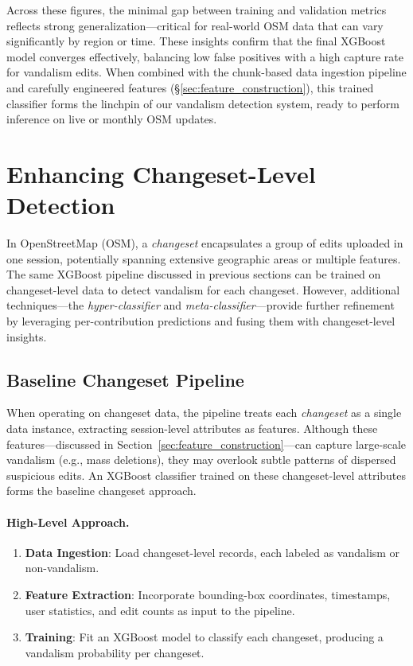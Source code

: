 \documentclass[
    13pt, %
    a4paper, %
    listof=totoc, %
    bibliography=totoc, %
    index=totoc, %
    headsepline
]{scrreprt}
\begin{document}
Across these figures, the minimal gap between training and validation metrics reflects strong
generalization—critical for real-world OSM data that can vary significantly by region or time.
These insights confirm that the final XGBoost model converges effectively, balancing low false
positives with a high capture rate for vandalism edits. When combined with the chunk-based data ingestion pipeline and carefully engineered features (\S\ref{sec:feature_construction}), this trained classifier forms
the linchpin of our vandalism detection system, ready to perform inference on live or monthly
OSM updates.


\newpage
\section{Enhancing Changeset-Level Detection}
\label{sec:changeset_level_detection}

In OpenStreetMap (OSM), a \emph{changeset} encapsulates a group of edits uploaded in one session, potentially spanning extensive geographic areas or multiple features. The same XGBoost pipeline discussed in previous sections can be trained on changeset-level data to detect vandalism for each changeset. However, additional techniques—the \emph{hyper-classifier} and \emph{meta-classifier}—provide further refinement by leveraging per-contribution predictions and fusing them with changeset-level insights.

\subsection{Baseline Changeset Pipeline}
\label{subsec:baseline_changeset_pipeline}

When operating on changeset data, the pipeline treats each \emph{changeset} as a single data instance, extracting session-level attributes as features. Although these features—discussed in Section~\ref{sec:feature_construction}—can capture large-scale vandalism (e.g., mass deletions), they may overlook subtle patterns of dispersed suspicious edits. An XGBoost classifier trained on these changeset-level attributes forms the baseline changeset approach.

\paragraph{High-Level Approach.} 
\begin{enumerate}
    \item \textbf{Data Ingestion}: Load changeset-level records, each labeled as vandalism or non-vandalism.
    \item \textbf{Feature Extraction}: Incorporate bounding-box coordinates, timestamps, user statistics, and edit counts as input to the pipeline.
    \item \textbf{Training}: Fit an XGBoost model to classify each changeset, producing a vandalism probability per changeset.
\end{enumerate}
\end{document}
